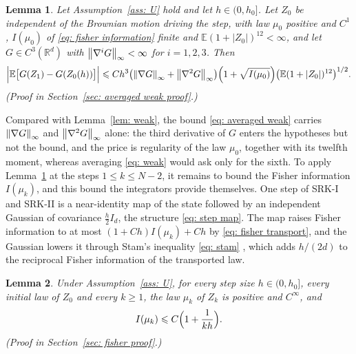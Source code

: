 \documentclass[namedate,webpdf,imanum]{ima-authoring-template}
\newcommand{\Le}{\leqslant}
\newcommand{\Ge}{\geqslant}
\theoremstyle{thmstyletwo}
\newtheorem{lemma}{Lemma}
\numberwithin{equation}{section}
\begin{document}
\begin{lemma}
\label{lem: averaged weak}
    Let Assumption~\ref{ass: U} hold and let $h \in (0, h_0]$. Let $Z_0$ be independent of the Brownian motion driving the step, with law $\mu_0$ positive and $C^1$, $I(\mu_0)$ of \eqref{eq: fisher information} finite and $\mathbb E (1 + |Z_0|)^{12} < \infty$, and let $G \in C^3(\mathbb R^d)$ with $\norm{\nabla^i G}_\infty < \infty$ for $i = 1, 2, 3$. Then
    \begin{equation}
        \Bigl| \mathbb E \bigl[ G(Z_1) - G(Z_0(h)) \bigr] \Bigr|
        \Le C h^3 \bigl( \norm{\nabla G}_\infty + \norm{\nabla^2 G}_\infty \bigr) \Bigl( 1 + \sqrt{I(\mu_0)} \Bigr) \bigl( \mathbb E ( 1 + |Z_0| )^{12} \bigr)^{1/2} .
        \label{eq: averaged weak}
    \end{equation}
    \emph{(Proof in Section~\ref{sec: averaged weak proof}.)}
\end{lemma}

Compared with Lemma~\ref{lem: weak}, the bound \eqref{eq: averaged weak} carries $\norm{\nabla G}_\infty$ and $\norm{\nabla^2 G}_\infty$ alone: the third derivative of $G$ enters the hypotheses but not the bound, and the price is regularity of the law $\mu_0$, together with its twelfth moment, whereas averaging \eqref{eq: weak} would ask only for the sixth. To apply Lemma~\ref{lem: averaged weak} at the steps $1 \Le k \Le N-2$, it remains to bound the Fisher information $I(\mu_k)$, and this bound the integrators provide themselves. One step of SRK-I and SRK-II is a near-identity map of the state followed by an independent Gaussian of covariance $\frac h2 I_d$, the structure \eqref{eq: step map}. The map raises Fisher information to at most $(1 + Ch) I(\mu_k) + Ch$ by \eqref{eq: fisher transport}, and the Gaussian lowers it through Stam's inequality \eqref{eq: stam} \citep{stam1959some, blachman1965convolution}, which adds $h/(2d)$ to the reciprocal Fisher information of the transported law.

\begin{lemma}
\label{lem: fisher}
    Under Assumption~\ref{ass: U}, for every step size $h \in (0, h_0]$, every initial law of $Z_0$ and every $k \Ge 1$, the law $\mu_k$ of $Z_k$ is positive and $C^\infty$, and
    \begin{equation}
        I(\mu_k) \Le C \Bigl( 1 + \frac{1}{kh} \Bigr) .
        \label{eq: fisher bound}
    \end{equation}
    \emph{(Proof in Section~\ref{sec: fisher proof}.)}
\end{lemma}
\end{document}
